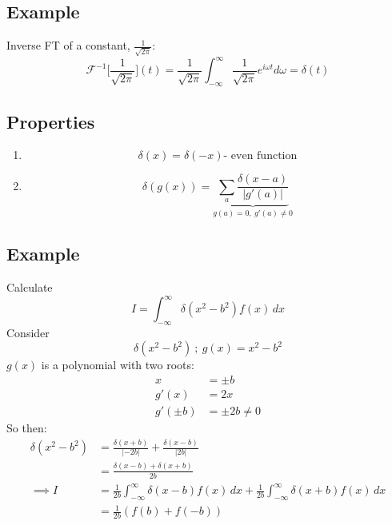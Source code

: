 \documentclass[a4paper, 11pt, normalem]{report}
\newcommand\ifnt{\int_{-\infty}^{\infty}}
\newcommand\F{\mathcal{F}}
\newcommand\om{\omega}
\begin{document}
\subsection{Example}
Inverse FT of a constant, $\frac{1}{\sqrt{2\pi}}$:
\begin{equation*}
    \F^{-1}\Big[\frac{1}{\sqrt{2\pi}}\Big](t) = \frac{1}{\sqrt{2\pi}} \ifnt \frac{1}{\sqrt{2\pi}} e^{i\om t}d\om = \delta(t)
\end{equation*}

\subsection{Properties}
\begin{enumerate}
    \item   \begin{equation*}
                \delta(x) = \delta(-x) \text{- even function}
            \end{equation*}
    \item   \begin{equation*}
                \delta(g(x)) = \underbrace{\sum_{a} \frac{\delta(x - a)}{|g'(a)|}}_{g(a) = 0,~g'(a) \neq 0}
            \end{equation*}
\end{enumerate}


\subsection{Example}
Calculate
\begin{equation*}
    I = \ifnt \delta(x^2 - b^2)f(x)\,dx
\end{equation*}
Consider
\begin{equation*}
    \delta(x^2 - b^2) ~;~ g(x) = x^2 - b^2
\end{equation*}
$g(x)$ is a polynomial with two roots:
\begin{align*}
    x &= \pm b \\
    g'(x) &= 2x \\
    g'(\pm b) &= \pm 2b \neq 0
\end{align*}
So then:
\begin{align*}
    \delta(x^2 - b^2) &= \frac{\delta(x + b)}{|-2b|} + \frac{\delta(x - b)}{|2b|} \\
    &= \frac{\delta(x - b) + \delta(x + b)}{2b} \\
    \implies I &= \frac{1}{2b} \ifnt \delta(x - b)f(x)\,dx + \frac{1}{2b}\ifnt \delta(x + b)f(x)\,dx \\
    &= \frac{1}{2b}(f(b) + f(-b))
\end{align*}
\end{document}
